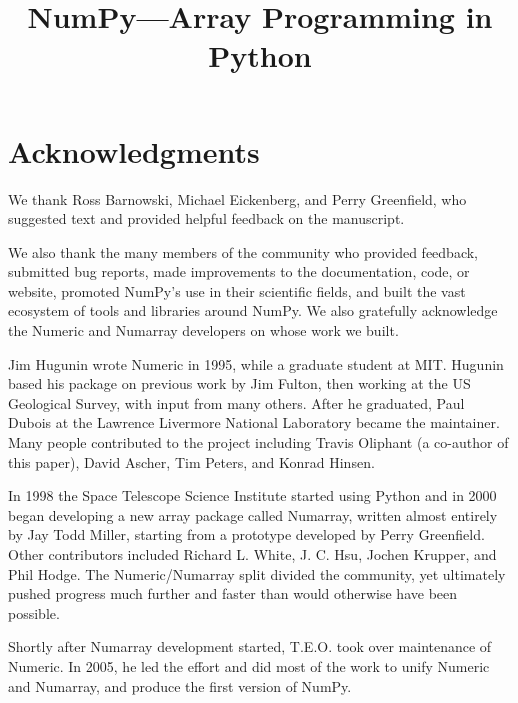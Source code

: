 \documentclass[fleqn,10pt,twocolumn]{wlscirep}
\title{NumPy---Array Programming in Python}
\begin{document}
\flushbottom
\maketitle
\thispagestyle{empty}







\newpage



\section*{Acknowledgments}

We thank Ross Barnowski, Michael Eickenberg, and Perry Greenfield, who
suggested text and provided helpful feedback on the manuscript.

We also thank the many members of the community who provided
feedback, submitted bug reports, made improvements to the documentation,
code, or website, promoted NumPy's use in their scientific fields, and built
the vast ecosystem of tools and libraries around NumPy.
We also gratefully acknowledge the Numeric and Numarray developers
on whose work we built.  

Jim Hugunin wrote Numeric in 1995, while a graduate student at MIT.
Hugunin based his package on previous work by Jim Fulton, then working at the
US Geological Survey, with input from many others.
After he graduated, Paul Dubois at the Lawrence Livermore National Laboratory
became the maintainer.
Many people contributed to the project including Travis Oliphant (a co-author
of this paper), David Ascher, Tim Peters, and Konrad Hinsen.

In 1998 the Space Telescope Science Institute started using Python
and in 2000 began developing a new array package called Numarray, written
almost entirely by Jay Todd Miller, starting from a prototype developed by
Perry Greenfield.  Other contributors included Richard L. White, J. C. Hsu,
Jochen Krupper, and Phil Hodge.
The Numeric/Numarray split divided the community, yet ultimately pushed
progress much further and faster than would otherwise have been possible. 

Shortly after Numarray development started, T.E.O. took over maintenance of
Numeric. In 2005, he led the effort and did most of the work to unify Numeric
and Numarray, and produce the first version of NumPy.
\end{document}
